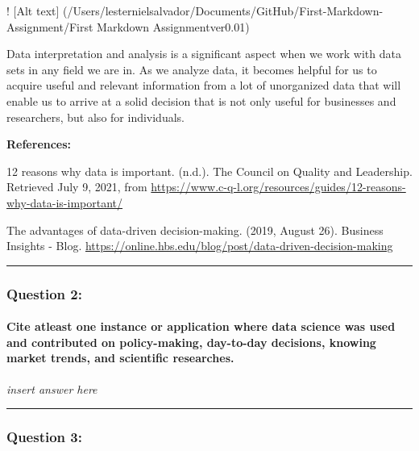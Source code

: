\documentclass[
]{article}
\begin{document}
! {[}Alt text{]}
(/Users/lesternielsalvador/Documents/GitHub/First-Markdown-Assignment/First
Markdown Assignmentver0.01)

Data interpretation and analysis is a significant aspect when we work
with data sets in any field we are in. As we analyze data, it becomes
helpful for us to acquire useful and relevant information from a lot of
unorganized data that will enable us to arrive at a solid decision that
is not only useful for businesses and researchers, but also for
individuals.

\textbf{References:}

12 reasons why data is important. (n.d.). The Council on Quality and
Leadership. Retrieved July 9, 2021, from
\url{https://www.c-q-l.org/resources/guides/12-reasons-why-data-is-important/}

The advantages of data-driven decision-making. (2019, August 26).
Business Insights - Blog.
\url{https://online.hbs.edu/blog/post/data-driven-decision-making}

\begin{center}\rule{0.5\linewidth}{0.5pt}\end{center}

\hypertarget{question-2}{%
\subsubsection{\texorpdfstring{\textbf{Question
2:}}{Question 2:}}\label{question-2}}

\hypertarget{cite-atleast-one-instance-or-application-where-data-science-was-used-and-contributed-on-policy-making-day-to-day-decisions-knowing-market-trends-and-scientific-researches.}{%
\paragraph{Cite atleast one instance or application where data science
was used and contributed on policy-making, day-to-day decisions, knowing
market trends, and scientific
researches.}\label{cite-atleast-one-instance-or-application-where-data-science-was-used-and-contributed-on-policy-making-day-to-day-decisions-knowing-market-trends-and-scientific-researches.}}

\emph{insert answer here}

\begin{center}\rule{0.5\linewidth}{0.5pt}\end{center}

\hypertarget{question-3}{%
\subsubsection{\texorpdfstring{\textbf{Question
3:}}{Question 3:}}\label{question-3}}
\end{document}
